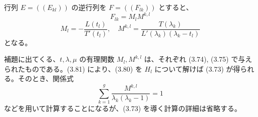 \begin{story}
\begin{lemma}[3.4]
行列 $E = ((E_{kl}))$ の逆行列を $F = ((F_{lk}))$ とすると、
\begin{equation}
    F_{lk} = M_l M^{k,l} \label{eq:3.81}
\end{equation}
\begin{equation*}
    M_l = - \frac{L(t_l)}{T'(t_l)}, \quad M^{k,l} = \frac{T(\lambda_k)}{L'(\lambda_k)(\lambda_k - t_l)}
\end{equation*}
となる。
\end{lemma}

補題に出てくる、$t, \lambda, \mu$ の有理関数 $M_l, M^{k,l}$ は、それぞれ (3.74), (3.75) で与えられたものである。(3.81) により、(3.80) を $H_l$ について解けば (3.73) が得られる。そのとき、関係式
\begin{equation*}
    \sum_{k=1}^g \frac{M^{k,l}}{\lambda_k(\lambda_k-1)} = 1
\end{equation*}
などを用いて計算することになるが、(3.73) を導く計算の詳細は省略する。


\end{story}

